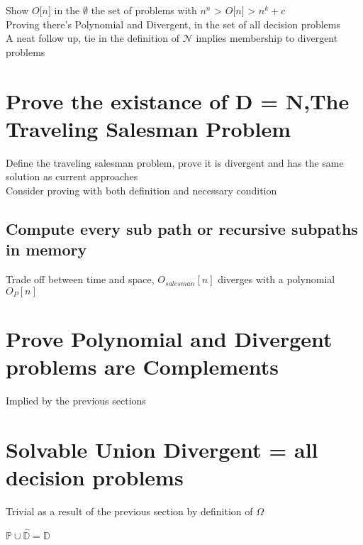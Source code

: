 \documentclass[11pt]{article}
\begin{document}
Show  $O \lbrack n \rbrack$ in the $\emptyset$ the set of problems with    $n^n$ > $O \lbrack n \rbrack$ > $n^k + c$\\
Proving there's Polynomial and Divergent, in the set of all decision problems\\


A neat follow up, tie in the definition of $\mathcal{N}$ implies membership to divergent problems


\newpage

\section{Prove the existance of D = N,The Traveling Salesman Problem}
Define the traveling salesman problem, prove it is divergent and has the same solution as current approaches\\
Consider proving with both definition and necessary condition\\

\subsection{Compute every sub path or recursive subpaths in memory}
Trade off between time and space, $O_{salesman}[n]$ diverges with a polynomial $O_P[n]$



\section{Prove Polynomial and Divergent problems are Complements}
Implied by the previous sections

\section{Solvable Union Divergent = all decision problems}
Trivial as a result of the previous section by definition of $\Omega$
\begin{center}
$\mathbb{P} \cup \hat{\mathbb{D}} = \mathbb{D}$
\end{center}





\newpage
\end{document}

